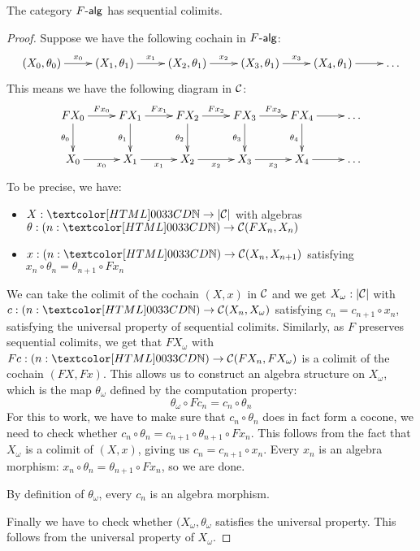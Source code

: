 \begin{proposition}
  The category $\algcat{F}$ has sequential colimits.
\end{proposition}

\begin{proof}
  Suppose we have the following cochain in $\algcat{F}$:
  $$
  \xymatrix{
    (X_0,\theta_0) \ar[r]^{x_0}
    &(X_1,\theta_1) \ar[r]^{x_1} 
    &(X_2,\theta_1) \ar[r]^{x_2} 
    &(X_3,\theta_1) \ar[r]^{x_3}
    &(X_4,\theta_1) \ar[r]
    &\hdots
  }
  $$
  This means we have the following diagram in $\mathcal{C}$:
  $$
  \xymatrix{
    F X_0 \ar[r]^{F x_0} \ar[d]_{\theta_0}
    &F X_1 \ar[r]^{F x_1} \ar[d]_{\theta_1}
    &F X_2 \ar[r]^{F x_2} \ar[d]_{\theta_2}
    &F X_3 \ar[r]^{F x_3} \ar[d]_{\theta_3}
    &F X_4 \ar[r] \ar[d]_{\theta_4} 
    &\hdots
    \\
    X_0 \ar[r]_{x_0}
    &X_1 \ar[r]_{x_1}
    &X_2 \ar[r]_{x_2}
    &X_3 \ar[r]_{x_3}
    &X_4 \ar[r]
    &\hdots
  }
  $$
  To be precise, we have:
  \begin{itemize}
  \item $X : \natty \to | \Cc |$ with algebras $\theta : (n : \natty) \to \Cc(F X_n, X_n)$
  \item $x : (n : \natty) \to \Cc(X_n,X_{n+1})$ satisfying $x_n \circ \theta_n = \theta_{n+1} \circ Fx_n$
  \end{itemize}

  We can take the colimit of the cochain $(X,x)$ in $\mathcal{C}$ and we get
  $X_{\omega} : | \mathcal{C} |$ with
  $c : (n : \natty) \to \Cc(X_n,X_{\omega})$ satisfying
  $c_n = c_{n+1} \circ x_n$, satisfying the universal property of
  sequential colimits. Similarly, as $F$ preserves sequential
  colimits, we get that $FX_{\omega}$ with
  $Fc : (n : \natty) \to \Cc(FX_n,FX_{\omega})$ is a colimit of the
  cochain $(FX,Fx)$. This allows us to construct an algebra structure
  on $X_{\omega}$, which is the map $\theta_{\omega}$ defined by the
  computation property:
  $$
  \theta_{\omega} \circ Fc_n = c_n \circ \theta_n
  $$
  For this to work, we have to make sure that $c_n \circ \theta_n$
  does in fact form a cocone, \ie we need to check whether
  $c_n \circ \theta_n = c_{n+1} \circ \theta_{n+1} \circ Fx_n$. This
  follows from the fact that $X_{\omega}$ is a colimit of $(X,x)$,
  giving us $c_n = c_{n+1} \circ x_n$. Every $x_n$ is an algebra
  morphism: $x_n \circ \theta_n = \theta_{n+1} \circ Fx_n$, so we are
  done.

  By definition of $\theta_{\omega}$, every $c_n$ is an algebra
  morphism.

  Finally we have to check whether $(X_{\omega},\theta_{\omega}$
  satisfies the universal property. This follows from the universal
  property of $X_{\omega}$.
\end{proof}

